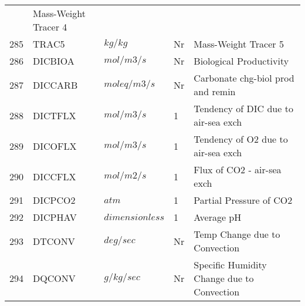 \begin{tabular}{lllll}
         &\begin{minipage}[t]{3in}
          {Mass-Weight Tracer 4} 
         \end{minipage}\\
285& TRAC5    & $kg/kg$ & Nr
         &\begin{minipage}[t]{3in}
          {Mass-Weight Tracer 5} 
         \end{minipage}\\
286& DICBIOA  & $mol/m3/s$ & Nr
         &\begin{minipage}[t]{3in}
          {Biological Productivity} 
         \end{minipage}\\
287& DICCARB  & $mol eq/m3/s$ & Nr
         &\begin{minipage}[t]{3in}
          {Carbonate chg-biol prod and remin} 
         \end{minipage}\\
288& DICTFLX  & $mol/m3/s$ & 1
         &\begin{minipage}[t]{3in}
          {Tendency of DIC due to air-sea exch} 
         \end{minipage}\\
289& DICOFLX  & $mol/m3/s$ & 1
         &\begin{minipage}[t]{3in}
          {Tendency of O2 due to air-sea exch} 
         \end{minipage}\\
290& DICCFLX  & $mol/m2/s$ & 1
         &\begin{minipage}[t]{3in}
          {Flux of CO2 - air-sea exch} 
         \end{minipage}\\
291& DICPCO2  & $atm$ & 1
         &\begin{minipage}[t]{3in}
          {Partial Pressure of CO2} 
         \end{minipage}\\
292& DICPHAV  & $dimensionless$ & 1
         &\begin{minipage}[t]{3in}
          {Average pH} 
         \end{minipage}\\
293& DTCONV   & $deg/sec$ & Nr
         &\begin{minipage}[t]{3in}
          {Temp Change due to Convection} 
         \end{minipage}\\
294& DQCONV   & $g/kg/sec$ & Nr
         &\begin{minipage}[t]{3in}
          {Specific Humidity Change due to Convection} 

\end{minipage}
\end{tabular}
